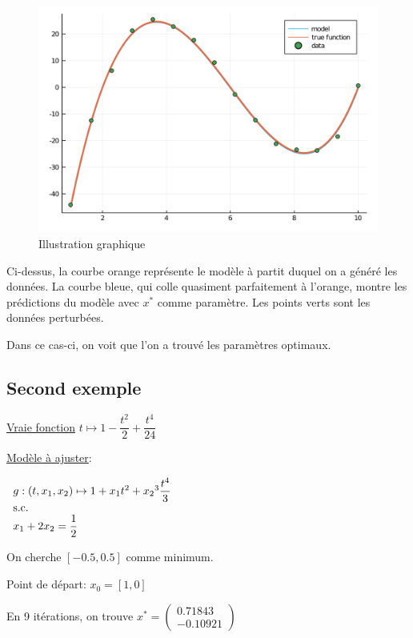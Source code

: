 \documentclass[a4paper,11pt]{article}
\numberwithin{equation}{section}
\begin{document}
\begin{figure}[!h]
\centering
\includegraphics[scale=0.6]{images/courbe1}
\caption{Illustration graphique}
\end{figure}

Ci-dessus, la courbe orange représente le modèle à partit duquel on a généré les données. La courbe bleue, qui colle quasiment parfaitement à l'orange, montre les prédictions du modèle avec $x^{*}$ comme paramètre. Les points verts sont les données perturbées. 

Dans ce cas-ci, on voit que l'on a trouvé les paramètres optimaux.
\newpage
\subsection{Second exemple}

\underline{Vraie fonction} $t\mapsto 1 - \dfrac{t^2}{2} + \dfrac{t^4}{24}$
\newline

\underline{Modèle à ajuster}:

$
\begin{array}{l l l }
g:(t, x_1, x_2) \mapsto 1 + x_1t^2 + {x_2}^3\dfrac{t^4}{3}\\
\text{s.c.}\\
x_1 + 2x_2 = \dfrac{1}{2}
\end{array}
$

On cherche $[-0.5,0.5]$ comme minimum.


Point de départ:
$x_{0} = [1, 0]$

En 9 itérations, on trouve 
 $x^{*} = \begin{pmatrix}
0.71843\\
-0.10921
\end{pmatrix}$
\end{document}
